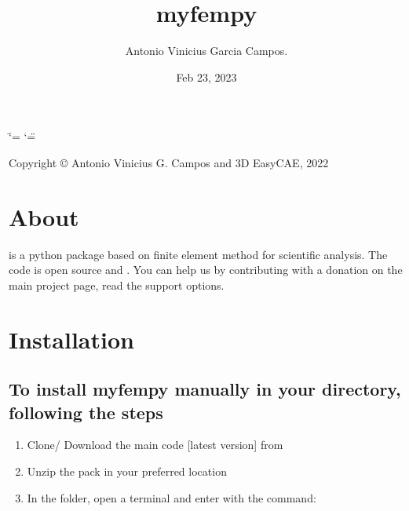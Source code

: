 \documentclass[letterpaper,10pt,english]{sphinxmanual}
\title{myfempy}
\date{Feb 23, 2023}
\author{Antonio Vinicius Garcia Campos.\@{}}
\begin{document}
\ifdefined\shorthandoff
  \ifnum\catcode`\=\string=\active\shorthandoff{=}\fi
  \ifnum\catcode`\"=\active{}\fi
\fi

\pagestyle{empty}
\sphinxmaketitle
\pagestyle{plain}
\sphinxtableofcontents
\pagestyle{normal}
\label{\detokenize{index::doc}}
\sphinxAtStartPar
{}

\begin{figure}[htbp]
\centering

\noindent{}
\end{figure}



\sphinxAtStartPar
Copyright © Antonio Vinicius G. Campos and 3D EasyCAE, 2022


\chapter{About}
\label{\detokenize{index:about}}
\sphinxAtStartPar
{} is a python package based on finite element method for
scientific analysis. The code is open source and . You can help us by contributing with a donation on the main
project page, read the support options. 


\chapter{Installation}
\label{\detokenize{index:installation}}

\section{To install myfempy manually in your directory, following the steps}
\label{\detokenize{index:to-install-myfempy-manually-in-your-directory-following-the-steps}}\begin{enumerate}
%
\item {} 
\sphinxAtStartPar
Clone/ Download the main code {[}latest version{]} from

\item {} 
\sphinxAtStartPar
Unzip the pack in your preferred location

\item {} 
\sphinxAtStartPar
In the  folder, open a terminal and enter with the
command:

\end{enumerate}
\end{document}
